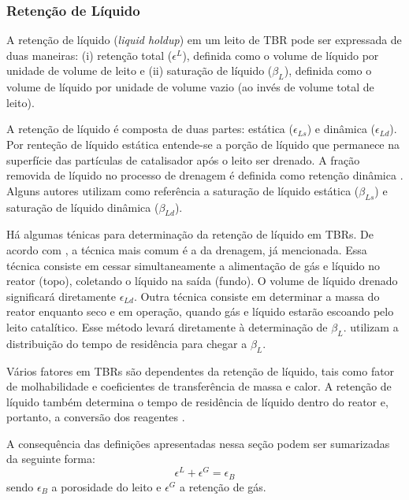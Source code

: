 \subsubsection{Retenção de Líquido}
\label{sec:retencaodeliquido}

A retenção de líquido (\emph{liquid holdup}) em um leito de TBR  pode ser
expressada de duas maneiras: (i) retenção total ($\epsilon^L$), definida como o
volume de líquido por unidade de volume de leito e (ii) saturação de líquido
($\beta_L$), definida como o volume de líquido por unidade de volume vazio (ao
invés de volume total de leito).

A retenção de líquido é composta de duas partes: estática ($\epsilon_{Ls}$) e
dinâmica ($\epsilon_{Ld}$). Por renteção de líquido estática entende-se a porção
de líquido que permanece na superfície das partículas de catalisador após o
leito ser drenado. A fração removida de líquido no processo de drenagem é
definida como retenção dinâmica \cite{Ranade2011}. Alguns autores utilizam como
referência a saturação de líquido estática ($\beta_{Ls}$) e saturação de líquido
dinâmica ($\beta_{Ld}$).

Há algumas ténicas para determinação da retenção de líquido em TBRs. De acordo
com \cite{Benkrid1997}, a técnica mais comum é a da drenagem, já
mencionada. Essa técnica consiste em cessar simultaneamente a alimentação de gás
e líquido no reator (topo), coletando o líquido na saída (fundo). O volume de
líquido drenado significará diretamente $\epsilon_{Ld}$. Outra técnica consiste
em determinar a massa do reator enquanto seco e em operação, quando gás e
líquido estarão escoando pelo leito catalítico. Esse método levará diretamente à
determinação de $\beta_L$. \cite{Larachi1991} utilizam a distribuição do
tempo de residência para chegar a $\beta_L$.

Vários fatores em TBRs são dependentes da retenção de líquido, tais como fator
de molhabilidade e coeficientes de transferência de massa e calor. A retenção de
líquido também determina o tempo de residência de líquido dentro do reator e,
portanto, a conversão dos reagentes \cite{Ranade2011}.

A consequência das definições apresentadas nessa seção podem ser sumarizadas
da seguinte forma:
\begin{equation}
\epsilon^L + \epsilon^G = \epsilon_B
\label{eq:balancoespaco1}
\end{equation}
sendo $\epsilon_B$ a porosidade do leito e $\epsilon^G$ a retenção de gás.

